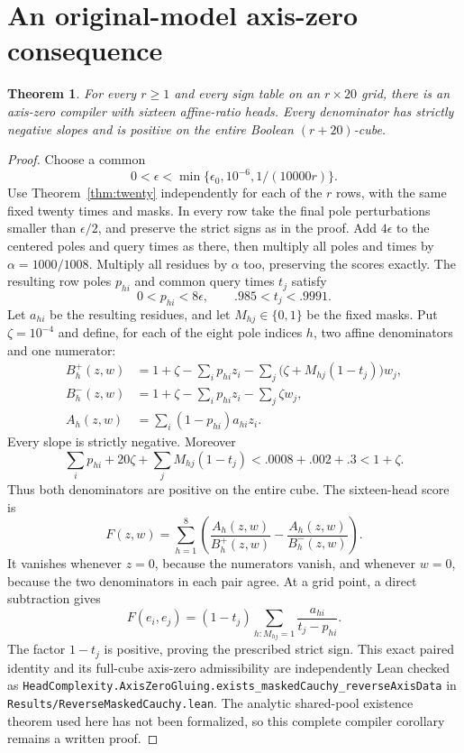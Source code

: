\documentclass[11pt]{article}
\newtheorem{theorem}{Theorem}
\begin{document}
\section{An original-model axis-zero consequence}
\begin{theorem}\label{thm:compiler}
For every $r\geq1$ and every sign table on an $r\times20$ grid,
there is an axis-zero compiler with sixteen affine-ratio heads. Every
denominator has strictly negative slopes and is positive on the entire
Boolean $(r+20)$-cube.
\end{theorem}
\begin{proof}
Choose a common
\[
 0<\epsilon<\min\{\epsilon_0,10^{-6},1/(10000r)\}.
\]
Use Theorem~\ref{thm:twenty} independently for each of the $r$ rows,
with the same fixed twenty times and masks. In every row take the final
pole perturbations smaller than $\epsilon/2$, and preserve the strict
signs as in the proof. Add $4\epsilon$ to the centered poles and query
times as there, then multiply all poles and times by
$\alpha=1000/1008$. Multiply all residues by $\alpha$ too, preserving
the scores exactly. The resulting row poles $p_{hi}$ and common query
times $t_j$ satisfy
\[
 0<p_{hi}<8\epsilon,\qquad .985<t_j<.9991.
\]
Let $a_{hi}$ be the resulting residues, and let $M_{hj}\in\{0,1\}$
be the fixed masks. Put $\zeta=10^{-4}$ and define, for each of the
eight pole indices $h$, two affine denominators and one numerator:
\[
\begin{split}
 B_h^+(z,w)&=1+\zeta-\sum_i p_{hi}z_i
               -\sum_j\bigl(\zeta+M_{hj}(1-t_j)\bigr)w_j,\\
 B_h^-(z,w)&=1+\zeta-\sum_i p_{hi}z_i-\sum_j\zeta w_j,\\
 A_h(z,w)&=\sum_i(1-p_{hi})a_{hi}z_i.
\end{split}
\]
Every slope is strictly negative. Moreover
\[
 \sum_i p_{hi}+20\zeta+\sum_j M_{hj}(1-t_j)
 <.0008+.002+.3<1+\zeta.
\]
Thus both denominators are positive on the entire cube. The sixteen-head
score is
\[
 F(z,w)=\sum_{h=1}^8\left(\frac{A_h(z,w)}{B_h^+(z,w)}
                         -\frac{A_h(z,w)}{B_h^-(z,w)}\right).
\]
It vanishes whenever $z=0$, because the numerators vanish, and whenever
$w=0$, because the two denominators in each pair agree. At a grid point,
a direct subtraction gives
\[
 F(e_i,e_j)=(1-t_j)\sum_{h:M_{hj}=1}\frac{a_{hi}}{t_j-p_{hi}}.
\]
The factor $1-t_j$ is positive, proving the prescribed strict sign.
This exact paired identity and its full-cube axis-zero admissibility
are independently Lean checked as
\texttt{HeadComplexity.AxisZeroGluing.exists\_maskedCauchy\_reverseAxisData}
in \texttt{Results/ReverseMaskedCauchy.lean}. The analytic shared-pool
existence theorem used here has not been formalized, so this complete
compiler corollary remains a written proof.
\end{proof}
\end{document}
